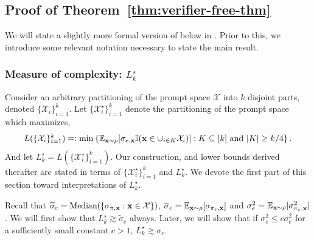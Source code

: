 \subsection{Proof of Theorem~\ref{thm:verifier-free-thm}}
\label{subsec:proof-verifier-free-thm}

We will state a slightly more formal version of  below in . Prior to this, we introduce some relevant notation necessary to state the main result.

\subsubsection{Measure of complexity: \texorpdfstring{$L_k^\star$}{}}

Consider an arbitrary partitioning of the prompt space $\mathcal{X}$ into $k$ disjoint parts, denoted $\{ \mathcal{X}_i \}_{i=1}^k$. Let $\{ \mathcal{X}^\star_i \}_{i=1}^k$ denote the partitioning of the prompt space which maximizes,
\begin{align} \label{eq:Lstar}
    L(\{\mathcal{X}_i\}_{i=1}^k) \mathrel{\mathop=}: \min \left\{ \mathbb{E}_{\mathbf{x} \sim \rho} [\sigma_{e,\mathbf{x}} \mathbb{I} (\mathbf{x} \in \cup_{i \in K} \mathcal{X}_i)] : K \subseteq [k] \text{ and } |K| \ge k/4 \right\}.
\end{align}
And let $L^\star_k = L(\{\mathcal{X}^\star_i\}_{i=1}^k)$. Our construction, and lower bounds derived therafter are stated in terms of $\{ \mathcal{X}_i^\star \}_{i=1}^k$ and $L^\star_k$. We devote the first part of this section toward interpretations of $L_k^\star$.

Recall that $\widetilde{\sigma}_e = \text{Median} ( \{ \sigma_{\pi,\mathbf{x}} : \mathbf{x} \in \mathcal{X} \} )$, $\overline{\sigma}_e = \mathbb{E}_{\mathbf{x} \sim \rho}  [\sigma_{\pi_e,\mathbf{x}}]$ and $\sigma^2_e = \mathbb{E}_{\mathbf{x} \sim \rho} [\sigma_{\pi_e,\mathbf{x}}^2]$. We will first show that $L_k^\star \gtrsim \widetilde{\sigma}_e$ always. Later, we will show that if $\sigma_e^2 \le c \overline{\sigma}_e^2$ for a sufficiently small constant $c > 1$, $L_k^\star \gtrsim \sigma_e$.

